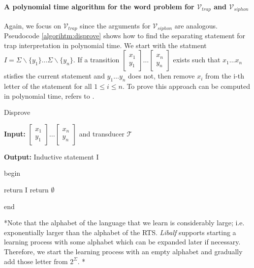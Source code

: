 \paragraph{A polynomial time algorithm for the word problem for $\mathcal{V}_{trap}$ and $\mathcal{V}_{siphon}$}
Again, we focus on $\mathcal{V}_{trap}$ since the arguments for $\mathcal{V}_{siphon}$ are analogous.
Pseudocode \ref{algorihtm:disprove} shows how to find the separating 
statement for trap interpretation in polynomial time.
We start with the statment $I = \Sigma \backslash \{y_1\} \dots \Sigma \backslash \{y_n\}$.
If a transition $\left[\substack{x_1 \\ y_1}\right] \dots \left[\substack{x_n \\ y_n}\right]$ exists such that 
$x_1 \dots x_n$ stisfies the current statement and $y_1 \dots y_n$ does not,
then remove $x_i$ from the i-th letter of the statement for all $1 \leq i \leq n$.
To prove this approach can be computed in polynomial time, refers to \cite{latex}.

\begin{algorithm}
    \caption{Disprove}\label{algorihtm:disprove}
    \textbf{Input: } $\left[\substack{x_1 \\ y_1}\right] \dots \left[\substack{x_n \\ y_n}\right]$ and transducer $\mathcal{T}$

    \textbf{Output: } Inductive statement I
    
    begin
    \begin{algorithmic}[1]
        \EndFor
                \EndFor
            \Else
                \State return I
            \EndIf
        \EndWhile
        \State return $\emptyset$
    \end{algorithmic}
    end
\end{algorithm}

*Note that the alphabet of the language that we learn is
considerably large; i.e. exponentially larger than the alphabet
of the RTS. \textit{Libalf} supports starting a learning process
with some alphabet which can be expanded later if necessary.
Therefore, we start the learning process with an empty alphabet 
and gradually add those letter from  $2^\Sigma$. *
